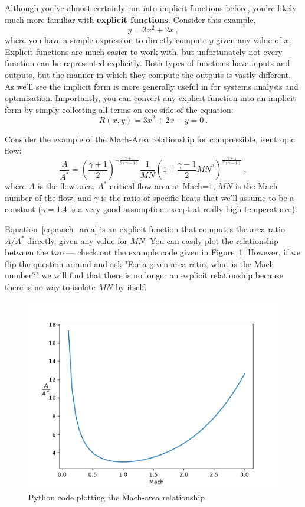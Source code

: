 \documentclass[conf]{new-aiaa}
\begin{document}
Although you've almost certainly run into implicit functions before, you're likely much more familiar with \textbf{explicit functions}. 
Consider this example,  
\begin{equation}
    y = 3x^2 + 2x \ ,
\end{equation}
where you have a simple expression to directly compute $y$ given any value of $x$. 
Explicit functions are much easier to work with, but unfortunately not every function can be represented explicitly. 
Both types of functions have inputs and outputs, but the manner in which they compute the outputs is vastly different. 
As we'll see the implicit form is more generally useful in for systems analysis and optimization. 
Importantly, you can convert any explicit function into an implicit form by simply collecting all terms on one side of the equation:  
\begin{equation}
    R(x,y) =  3x^2 + 2x -y = 0\ . 
\end{equation}

Consider the example of the Mach-Area relationship for compressible, isentropic flow: 
\begin{equation}
    \frac{A}{A^*} = \left(\frac{\gamma+1}{2}\right)^{-\frac{\gamma+1}{2(\gamma-1)}} 
                    \frac{1}{MN} 
                    \left( 1 + \frac{\gamma-1}{2}MN^2 \right)^{\frac{\gamma+1}{2(\gamma-1)}} \ ,
                    \label{eq:mach_area}
\end{equation}
where $A$ is the flow area, $A^*$ critical flow area at Mach=1, $MN$ is the Mach number of the flow, and $\gamma$ is the ratio of specific heats that we'll assume to be a constant ($\gamma=1.4$ is a very good assumption except at really high temperatures).

Equation~\eqref{eq:mach_area} is an explicit function that computes the area ratio $A/A^*$ directly, given any value for $MN$. 
You can easily plot the relationship between the two --- check out the example code given in Figure~\ref{fig:mach-area}. 
However, if we flip the question around and ask "For a given area ratio, what is the Mach number?" we will find that there is no longer an explicit relationship because there is no way to isolate $MN$ by itself. 
\begin{figure}[H]
    \centering
    
    \includegraphics[width=.75\textwidth]{mach_area.pdf}
    \caption{Python code plotting the Mach-area relationship}
    \label{fig:mach-area}
\end{figure}
\end{document}
